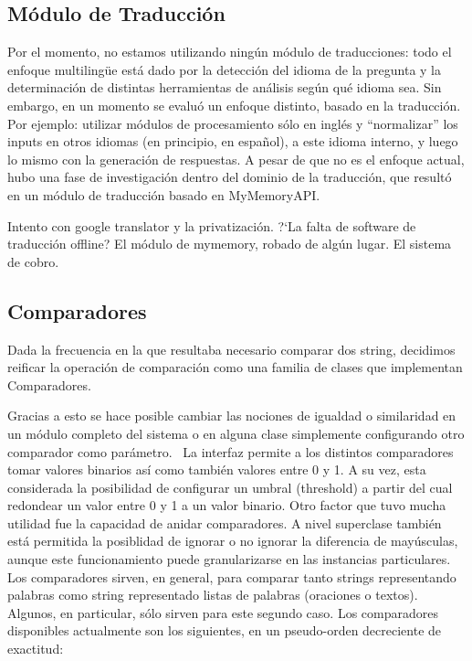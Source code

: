 \subsection{M\'odulo de Traducci\'on}

Por el momento, no estamos utilizando ning\'un m\'odulo de traducciones:
todo el enfoque multiling\"ue est\'a dado por la detecci\'on del idioma
de la pregunta y la determinaci\'on de distintas herramientas de
an\'alisis seg\'un qu\'e idioma sea. Sin embargo, en un momento se
evalu\'o un enfoque distinto, basado en la traducci\'on. Por ejemplo:
utilizar m\'odulos de procesamiento s\'olo en ingl\'es y
{\textquotedblleft}normalizar{\textquotedblright} los inputs en otros
idiomas (en principio, en espa\~nol), a este idioma interno, y luego lo
mismo con la generaci\'on de respuestas. A pesar de que no es el
enfoque actual, hubo una fase de investigaci\'on dentro del dominio de
la traducci\'on, que result\'o en un m\'odulo de traducci\'on basado en
MyMemoryAPI.

Intento con google translator y la privatizaci\'on. ?`La falta de
software de traducci\'on offline? El m\'odulo de mymemory, robado de
alg\'un lugar. El sistema de cobro. 

\subsection{Comparadores}

Dada la frecuencia en la que resultaba necesario comparar dos string,
decidimos reificar la operaci\'on de comparaci\'on como una familia de
clases que implementan Comparadores. 

Gracias a esto se hace posible cambiar las nociones de igualdad o
similaridad en un m\'odulo completo del sistema o en alguna clase
simplemente configurando otro comparador como par\'ametro. \ La
interfaz permite a los distintos comparadores tomar valores binarios
as\'i como tambi\'en valores entre 0 y 1. A su vez, esta considerada la
posibilidad de configurar un umbral (threshold) a partir del cual
redondear un valor entre 0 y 1 a un valor binario. Otro factor que tuvo
mucha utilidad fue la capacidad de anidar comparadores. A nivel
superclase tambi\'en est\'a permitida la posiblidad de ignorar o no
ignorar la diferencia de may\'usculas, aunque este funcionamiento puede
granularizarse en las instancias particulares. Los comparadores sirven,
en general, para comparar tanto strings representando palabras como
string representado listas de palabras (oraciones o textos). Algunos,
en particular, s\'olo sirven para este segundo caso. Los comparadores
disponibles actualmente son los siguientes, en un pseudo-orden
decreciente de exactitud:


